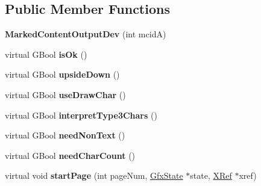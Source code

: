 \subsection*{Public Member Functions}
\begin{DoxyCompactItemize}
\item 
\mbox{\label{class_marked_content_output_dev_acad2a68586769b1152c11f277ffd7412}} 
{\bfseries Marked\+Content\+Output\+Dev} (int mcidA)
\item 
\mbox{\label{class_marked_content_output_dev_a66c85bce728432f1e5fe1028f2a61f9d}} 
virtual G\+Bool {\bfseries is\+Ok} ()
\item 
\mbox{\label{class_marked_content_output_dev_a1f252cc5dbded5ada1df762fa6bb5449}} 
virtual G\+Bool {\bfseries upside\+Down} ()
\item 
\mbox{\label{class_marked_content_output_dev_a7d4ad12ef5983a35c2766f9d030be545}} 
virtual G\+Bool {\bfseries use\+Draw\+Char} ()
\item 
\mbox{\label{class_marked_content_output_dev_a2af7a3092a37f7a25b3749b6d42536e8}} 
virtual G\+Bool {\bfseries interpret\+Type3\+Chars} ()
\item 
\mbox{\label{class_marked_content_output_dev_ae143e4cb4f6730ac945d2d04e77e8972}} 
virtual G\+Bool {\bfseries need\+Non\+Text} ()
\item 
\mbox{\label{class_marked_content_output_dev_a032b132998169d3f7a37de94b0d6697f}} 
virtual G\+Bool {\bfseries need\+Char\+Count} ()
\item 
\mbox{\label{class_marked_content_output_dev_a5d79166f122c303e95290a94ba4dd7e7}} 
virtual void {\bfseries start\+Page} (int page\+Num, \hyperlink{class_gfx_state}{Gfx\+State} $\ast$state, \hyperlink{class_x_ref}{X\+Ref} $\ast$xref)
\item 
\mbox{\label{class_marked_content_output_dev_a5d6a66c64ed43fdf1bf83abec0c018c9}} 

\end{DoxyCompactItemize}
